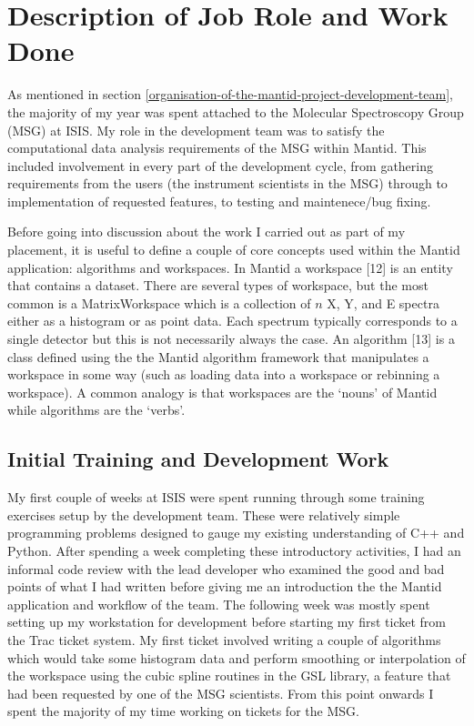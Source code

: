 \documentclass[paper=a4, fontsize=11pt]{scrartcl}	%
\numberwithin{equation}{section}															%
\numberwithin{figure}{section}																%
\numberwithin{table}{section}
\begin{document}
\clearpage
\section{Description of Job Role and Work
Done}\label{description-of-job-role-and-work-done}

As mentioned in section \ref{organisation-of-the-mantid-project-development-team}, the
majority of my year was spent attached to the Molecular Spectroscopy
Group (MSG) at ISIS. My role in the development team was to satisfy the
computational data analysis requirements of the MSG within Mantid. This
included involvement in every part of the development cycle, from
gathering requirements from the users (the instrument scientists in the
MSG) through to implementation of requested features, to testing and
maintenece/bug fixing.

Before going into discussion about the work I carried out as part of my
placement, it is useful to define a couple of core concepts used within
the Mantid application: algorithms and workspaces. In Mantid a workspace
{[}12{]} is an entity that contains a dataset. There are several types
of workspace, but the most common is a MatrixWorkspace which is a
collection of $n$ X, Y, and E spectra either as a histogram or as point
data. Each spectrum typically corresponds to a single detector but this is
not necessarily always the case. An algorithm {[}13{]} is a class
defined using the the Mantid algorithm framework that manipulates a
workspace in some way (such as loading data into a workspace or
rebinning a workspace). A common analogy is that workspaces are the
`nouns' of Mantid while algorithms are the `verbs'.

\subsection{Initial Training and Development
Work}\label{initial-training-and-development-work}

My first couple of weeks at ISIS were spent running through some
training exercises setup by the development team. These were relatively
simple programming problems designed to gauge my existing understanding
of C++ and Python. After spending a week completing these introductory
activities, I had an informal code review with the lead developer who
examined the good and bad points of what I had written before giving me
an introduction the the Mantid application and workflow of the team. The
following week was mostly spent setting up my workstation for
development before starting my first ticket from the Trac ticket system.
My first ticket involved writing a couple of algorithms which would take
some histogram data and perform smoothing or interpolation of the
workspace using the cubic spline routines in the GSL library, a feature
that had been requested by one of the MSG scientists. From this point
onwards I spent the majority of my time working on tickets for the MSG.
\end{document}
